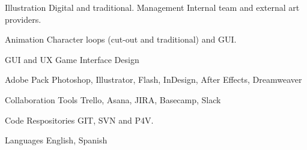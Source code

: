 

\begin{cvskills}

  \cvskill
    {Illustration} %
    {Digital and traditional.} %
  \cvskill
    {Management} %
    {Internal team and external art providers.} %

  \cvskill
    {Animation} %
    {Character loops (cut-out and traditional) and GUI.} %

  \cvskill
    {GUI and UX} %
    {Game Interface Design} %

  \cvskill
    {Adobe Pack} %
    {Photoshop, Illustrator, Flash, InDesign, After Effects, Dreamweaver} %

  \cvskill
    {Collaboration Tools} %
    {Trello, Asana, JIRA, Basecamp, Slack} %

  \cvskill
    {Code Respositories} %
    {GIT, SVN and P4V.} %


  \cvskill
    {Languages} %
    {English, Spanish} %

\end{cvskills}
